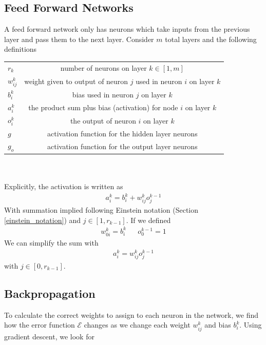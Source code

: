 \subsection{Feed Forward Networks}
A feed forward network only has neurons which take inputs from the previous layer and pass them to the next layer. Consider $m$ total layers and the following definitions \cite{brilliant_backpropagation}
\\
\begin{tabular}{ l c }
  $r_k$ & number of neurons on layer $k\in[1,m]$\\
  $w_{ij}^k$ & weight given to output of neuron $j$ used in neuron $i$ on layer $k$  \\
  $b_i^k$ & bias used in neuron $j$ on layer $k$   \\
  $a_i^k$ & the product sum plus bias (activation) for node $i$ on layer $k$  \\
  $o_i^k$ & the output of neuron $i$ on layer $k$ \\
  $g$ & activation function for the hidden layer neurons \\
  $g_o$ & activation function for the output layer neurons \\
\end{tabular}\\
\\
Explicitly, the activation is written as
\begin{align}
	a_i^k =b_i^k + w_{ij}^ko_j^{k-1}
\end{align}
With summation implied following Einstein notation (Section \ref{einstein_notation}) and $j\in [1,r_{k-1}]$. If we defined 
\begin{align}
	w^k_{0i}=b_i^k && o_0^{k-1}=1
\end{align}
We can simplify the sum with
\begin{align}\label{nn_activation}
	a_i^k = w_{ij}^ko_j^{k-1}
\end{align}
with $j\in [0,r_{k-1}]$.

\subsection{Backpropagation}
To calculate the correct weights to assign to each neuron in the network, we find how the error function $\mathcal{E}$ changes as we change each weight $w_{ij}^k$ and bias $b_i^k$. Using gradient descent, we look for

